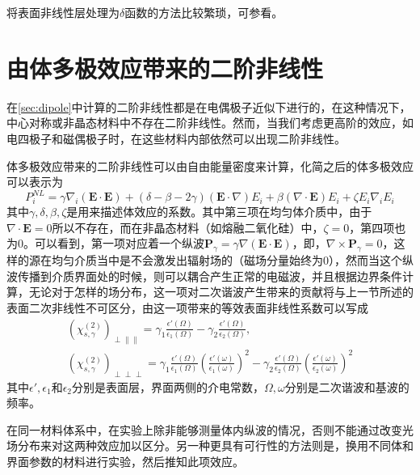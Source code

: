 将表面非线性层处理为$\delta$函数的方法比较繁琐，可参看\cite{kozyreff2008whispering}。

\section{由体多极效应带来的二阶非线性}
在\ref{sec:dipole}中计算的二阶非线性都是在电偶极子近似下进行的，在这种情况下，中心对称或非晶态材料中不存在二阶非线性。然而，当我们考虑更高阶的效应，如电四极子和磁偶极子时，在这些材料内部依然可以出现二阶非线性。

体多极效应带来的二阶非线性可以由自由能量密度来计算\cite{bloembergen1965nonlinear,shen1984principles}，化简之后的体多极效应可以表示为
\begin{equation}
P^{NL}_i = \gamma\nabla_i(\mathbf{E}\cdot\mathbf{E})+(\delta-\beta-2\gamma)(\mathbf{E}\cdot\nabla)E_i+\beta(\nabla \cdot \mathbf{E})E_i+\zeta E_i\nabla_iE_i
\label{eq:surfaceN}
\end{equation}
其中$\gamma, \delta, \beta, \zeta$是用来描述体效应的系数。其中第三项在均匀体介质中，由于$\nabla \cdot \mathbf{E}=0$所以不存在，而在非晶态材料（如熔融二氧化硅）中，$\zeta=0$，第四项也为0。可以看到，第一项对应着一个纵波$\mathbf{P}_\gamma =  \gamma\nabla(\mathbf{E}\cdot\mathbf{E})$，即，$\nabla \times \mathbf{P}_\gamma = 0$，这样的源在均匀介质当中是不会激发出辐射场的（磁场分量始终为0），然而当这个纵波传播到介质界面处的时候，则可以耦合产生正常的电磁波，并且根据边界条件计算，无论对于怎样的场分布，这一项对二次谐波产生带来的贡献将与上一节所述的表面二次非线性不可区分\cite{sipe1987new}，由这一项带来的等效表面非线性系数可以写成\cite{heinz1991second}
\begin{gather}
(\chi^{(2)}_{s,\gamma})_{\perp \parallel \parallel} = \gamma_1\frac{\epsilon '(\Omega)}{\epsilon_1(\Omega)}-\gamma_2\frac{\epsilon '(\Omega)}{\epsilon_2(\Omega)}, \\
(\chi^{(2)}_{s,\gamma})_{\perp \perp \perp} = \gamma_1\frac{\epsilon '(\Omega)}{\epsilon_1(\Omega)}(\frac{\epsilon '(\omega)}{\epsilon_1(\omega)})^2-\gamma_2\frac{\epsilon '(\Omega)}{\epsilon_2(\Omega)}(\frac{\epsilon '(\omega)}{\epsilon_2(\omega)})^2
\end{gather}
其中$\epsilon ', \epsilon_1$和$\epsilon_2$分别是表面层，界面两侧的介电常数，$\Omega, \omega$分别是二次谐波和基波的频率。

在同一材料体系中，在实验上除非能够测量体内纵波的情况，否则不能通过改变光场分布来对这两种效应加以区分。另一种更具有可行性的方法则是，换用不同体和界面参数的材料进行实验，然后推知此项效应。

